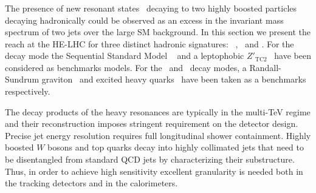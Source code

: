 \subsubsection{}
\label{subsubsec:hr_had}

\renewcommand{\pt}{\ensuremath{p_\text{T}}}
\newcommand*{\ptSup}[1]{\ensuremath{p_{\text{T}}^{\ensuremath{#1}}}}
\newcommand*{\eflow}{\ensuremath{E_\text{F}(\text{n},\alpha)}}
\newcommand*{\sqrtshelhc}{\ensuremath{\sqrt{s}=\text{27 TeV}}}
\renewcommand*{\intlumihelhc}{\ensuremath{\mathcal{L}=15\text{ ab}^{-1}}}


The presence of new resonant states~\cite{Harris:2011bh,Boelaert:2009jm,Lee:1973iz,Branco:2011iw,Hill:1994hp,Kaplan:1983sm,Bellazzini:2014yua,Randall:1999ee,Pomarol:1999ad} decaying to two highly boosted particles decaying hadronically could be observed as an excess in the invariant mass spectrum of two jets over the large SM background.
In this section we present the reach at the HE-LHC for three distinct hadronic signatures: \zptt\ , \rsg\ and \qjj. For the \zptt\, decay mode the Sequential Standard Model \ZpSSM~\cite{Langacker:2008yv} and a leptophobic $Z'_{\text{TC2}}$~\cite{Harris:1999ya,Harris:2011ez} have been considered as benchmarks \Zp models. For the \rsg\ and \qjj\, decay modes, a Randall-Sundrum graviton~\cite{Randall:1999ee} and excited heavy quarks~\cite{Baur:1987ga,Baur:1989kv} have been taken as a benchmarks respectively.

The decay products of the heavy resonances are typically in the multi-TeV regime and their reconstruction imposes stringent requirement on the detector design. Precise jet energy resolution requires full longitudinal shower containment. Highly boosted $W$ bosons and top quarks decay into highly collimated jets that need to be disentangled from standard QCD jets by characterizing their substructure. Thus, in order to achieve high sensitivity excellent granularity is needed both in the tracking detectors and in the calorimeters.

